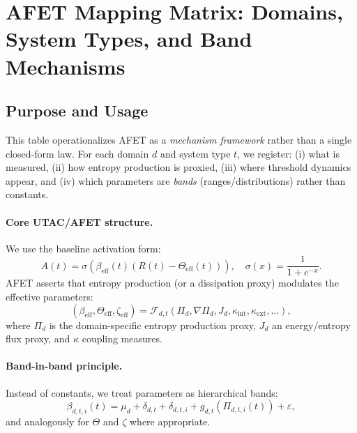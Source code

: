 
\section{AFET Mapping Matrix: Domains, System Types, and Band Mechanisms}

\subsection{Purpose and Usage}
This table operationalizes AFET as a \emph{mechanism framework} rather than a single closed-form law.
For each domain $d$ and system type $t$, we register:
(i) what is measured, (ii) how entropy production is proxied,
(iii) where threshold dynamics appear, and (iv) which parameters are \emph{bands} (ranges/distributions) rather than constants.

\paragraph{Core UTAC/AFET structure.}
We use the baseline activation form:
\begin{equation}
A(t)=\sigma\!\left(\beta_{\mathrm{eff}}(t)\left(R(t)-\Theta_{\mathrm{eff}}(t)\right)\right),
\quad
\sigma(x)=\frac{1}{1+e^{-x}}.
\end{equation}
AFET asserts that entropy production (or a dissipation proxy) modulates the effective parameters:
\begin{equation}
(\beta_{\mathrm{eff}},\Theta_{\mathrm{eff}},\zeta_{\mathrm{eff}})=\mathcal{F}_{d,t}\!\left(\Pi_d, \nabla \Pi_d, J_d, \kappa_{\text{int}}, \kappa_{\text{ext}}, \ldots \right),
\end{equation}
where $\Pi_d$ is the domain-specific entropy production proxy, $J_d$ an energy/entropy flux proxy, and $\kappa$ coupling measures.

\paragraph{Band-in-band principle.}
Instead of constants, we treat parameters as hierarchical bands:
\begin{equation}
\beta_{d,t,i}(t)=\mu_d + \delta_{d,t} + \delta_{d,t,i} + g_{d,t}\!\left(\Pi_{d,t,i}(t)\right) + \varepsilon,
\end{equation}
and analogously for $\Theta$ and $\zeta$ where appropriate.


